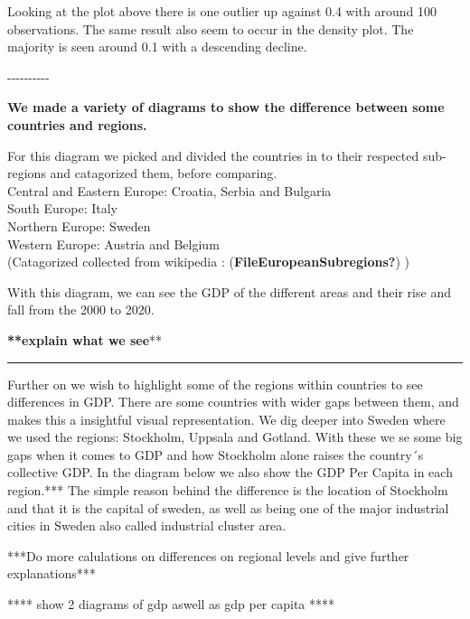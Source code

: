 \documentclass[
  a4paper,
  DIV=11,
  numbers=noendperiod]{scrartcl}
\begin{document}
Looking at the plot above there is one outlier up against 0.4 with
around 100 observations. The same result also seem to occur in the
density plot. The majority is seen around 0.1 with a descending decline.

-\/-\/-\/-\/-\/-\/-\/-\/-\/-

\textbf{We made a variety of diagrams to show the difference between
some countries and regions.}

For this diagram we picked and divided the countries in to their
respected sub-regions and catagorized them, before comparing.\\

Central and Eastern Europe: Croatia, Serbia and Bulgaria\\

South Europe: Italy\\

Northern Europe: Sweden\\

Western Europe: Austria and Belgium\\

(Catagorized collected from wikipedia :
(\textbf{FileEuropeanSubregions?}) )

With this diagram, we can see the GDP of the different areas and their
rise and fall from the 2000 to 2020.

\textbf{**explain what we see}**\\

\begin{center}\rule{0.5\linewidth}{0.5pt}\end{center}

Further on we wish to highlight some of the regions within countries to
see differences in GDP. There are some countries with wider gaps between
them, and makes this a insightful visual representation. We dig deeper
into Sweden where we used the regions: Stockholm, Uppsala and Gotland.
With these we se some big gaps when it comes to GDP and how Stockholm
alone raises the country´s collective GDP. In the diagram below we also
show the GDP Per Capita in each region.*** The simple reason behind the
difference is the location of Stockholm and that it is the capital of
sweden, as well as being one of the major industrial cities in Sweden
also called industrial cluster area.

***Do more calulations on differences on regional levels and give
further explanations***\\

\hfill\break

**** show 2 diagrams of gdp aswell as gdp per capita ****
\end{document}
